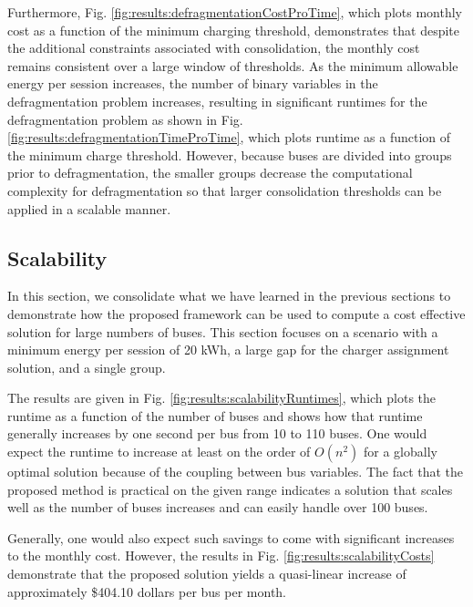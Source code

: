 \par Furthermore, Fig. \ref{fig:results:defragmentationCostProTime}, which plots monthly cost as a function of the minimum charging threshold, demonstrates that despite the additional constraints associated with consolidation, the monthly cost remains consistent over a large window of thresholds. As the minimum allowable energy per session increases, the number of binary variables in the defragmentation problem increases, resulting in significant runtimes for the defragmentation problem as shown in Fig. \ref{fig:results:defragmentationTimeProTime}, which plots runtime as a function of the minimum charge threshold. However, because buses are divided into groups prior to defragmentation, the smaller groups decrease the computational complexity for defragmentation so that larger consolidation thresholds can be applied in a scalable manner. 
 




\subsection{Scalability}

In this section, we consolidate what we have learned in the previous sections to demonstrate how the proposed framework can be used to compute a cost effective solution for large numbers of buses. This section focuses on a scenario with a minimum energy per session of 20 kWh, a large gap for the charger assignment solution, and a single group.

\par The results are given in Fig. \ref{fig:results:scalabilityRuntimes}, which plots the runtime as a function of the number of buses and shows how that runtime generally increases by one second per bus from 10 to 110 buses.  One would expect the runtime to increase at least on the order of $O(n^2)$ for a globally optimal solution because of the coupling between bus variables. The fact that the proposed method is practical on the given range indicates a solution that scales well as the number of buses increases and can easily handle over 100 buses.

\par Generally, one would also expect such savings to come with significant increases to the monthly cost. However, the results in Fig. \ref{fig:results:scalabilityCosts} demonstrate that the proposed solution yields a quasi-linear increase of approximately \$404.10 dollars per bus per month. 


	
	
